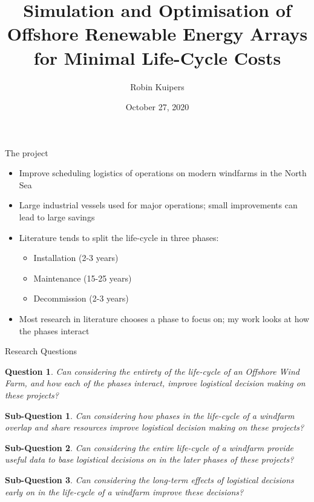 \documentclass{beamer}
\title[Logistical Optimisation for Offshore Windfarms]{Simulation and Optimisation of Offshore Renewable Energy Arrays for Minimal Life-Cycle Costs}
\author{Robin Kuipers}
\date{October 27, 2020}
\newtheorem*{rquestion}{Question}
\newtheorem{subquestion}{Sub-Question}
\newcommand{\textapprox}{\raisebox{0.5ex}{\texttildelow}}
\begin{document}
\begin{frame}
  \titlepage
\end{frame}


\begin{frame}{The project}
  \begin{itemize}
  	\item Improve scheduling logistics of operations on modern windfarms in the North Sea
  	\item Large industrial vessels used for major operations; small improvements can lead to large savings
  	\item Literature tends to split the life-cycle in three phases:
  	\begin{itemize}
  		\item Installation (\textapprox  2-3 years)
  		\item Maintenance (\textapprox 15-25 years)
  		\item Decommission (\textapprox 2-3 years)
  	\end{itemize}
	\item Most research in literature chooses a phase to focus on; my work looks at how the phases interact
  \end{itemize}
\end{frame}


\begin{frame}{Research Questions}
\small
\begin{rquestion}
Can considering the entirety of the life-cycle of an Offshore Wind Farm, and how each of the phases interact, improve logistical decision making on these projects?
\end{rquestion}

\bigskip

\begin{subquestion}
Can considering how phases in the life-cycle of a windfarm overlap and share resources improve logistical decision making on these projects?
\end{subquestion}

\begin{subquestion}
Can considering the entire life-cycle of a windfarm provide useful data to base logistical decisions on in the later phases of these projects?
\end{subquestion}

\begin{subquestion}
Can considering the long-term effects of logistical decisions early on in the life-cycle of a windfarm improve these decisions? 
\end{subquestion}
\end{frame}
\end{document}
